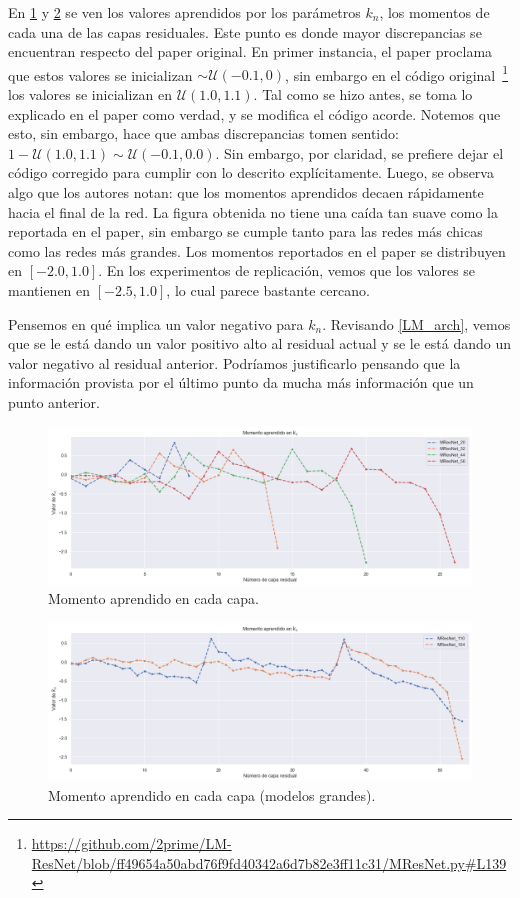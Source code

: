 \documentclass[titlepage,a4paper,oneside]{article}
\begin{document}
En \ref{momentum} y \ref{momentum_large} se ven los valores aprendidos por los parámetros $k_n$, los momentos de cada una de las capas residuales. Este punto es donde mayor discrepancias se encuentran respecto del paper original. En primer instancia, el paper proclama que estos valores se inicializan $\sim \mathscr{U}(-0.1, 0)$, sin embargo en el código original~\footnote{\url{https://github.com/2prime/LM-ResNet/blob/ff49654a50abd76f9fd40342a6d7b82e3ff11c31/MResNet.py\#L139}} los valores se inicializan en $\mathscr{U}(1.0, 1.1)$. Tal como se hizo antes, se toma lo explicado en el paper como verdad, y se modifica el código acorde. Notemos que esto, sin embargo, hace que ambas discrepancias tomen sentido: $1 - \mathscr{U}(1.0, 1.1) \sim \mathscr{U}(-0.1, 0.0)$. Sin embargo, por claridad, se prefiere dejar el código corregido para cumplir con lo descrito explícitamente. Luego, se observa algo que los autores notan: que los momentos aprendidos decaen rápidamente hacia el final de la red. La figura obtenida no tiene una caída tan suave como la reportada en el paper, sin embargo se cumple tanto para las redes más chicas como las redes más grandes. Los momentos reportados en el paper se distribuyen en $\left[-2.0, 1.0\right]$. En los experimentos de replicación, vemos que los valores se mantienen en $\left[-2.5, 1.0\right]$, lo cual parece bastante cercano.

Pensemos en qué implica un valor negativo para $k_n$. Revisando \ref{LM_arch}, vemos que se le está dando un valor positivo alto al residual actual y se le está dando un valor negativo al residual anterior. Podríamos justificarlo pensando que la información provista por el último punto da mucha más información que un punto anterior.

\begin{figure}[H]
\centering
\includegraphics[width=\textwidth]{images/momentum.png}
\caption{Momento aprendido en cada capa.}
\label{momentum}
\end{figure}

\begin{figure}[H]
\centering
\includegraphics[width=\textwidth]{images/momentum_large.png}
\caption{Momento aprendido en cada capa (modelos grandes).}
\label{momentum_large}
\end{figure}
\end{document}

